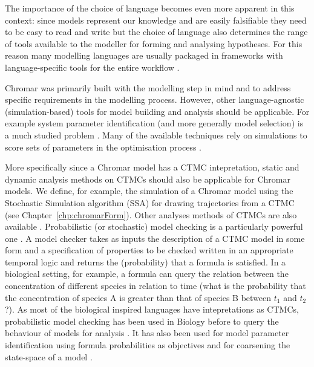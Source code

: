 The importance of the choice of language becomes even more apparent in this
context: since models represent our knowledge and are easily falsifiable they
need to be easy to read and write but the choice of language also determines the
range of tools available to the modeller for forming and analysing
hypotheses. For this reason many modelling languages are usually packaged in
frameworks with language-specific tools for the entire workflow
\citep{pradal_openalea:_2008, boutillier2018kappa,
  Calzone_Fages_Soliman_2006}.

Chromar was primarily built with the modelling step in mind and to address
specific requirements in the modelling process.  However, other
language-agnostic (\eg simulation-based) tools for model building and analysis
should be applicable. For example system parameter identification (and more
generally model selection) is a much studied problem \citep[inverse problem of
going from data to model;][]{engl2009inverse}. Many of the available techniques
rely on simulations to score sets of parameters in the optimisation process
\citep{moles2003parameter, toni2009simulation}.

More specifically since a Chromar model has a CTMC intepretation, static and
dynamic analysis methods on CTMCs should also be applicable for Chromar
models. We define, for example, the simulation of a Chromar model using the
Stochastic Simulation algorithm (SSA) for drawing trajectories from a CTMC (see
Chapter~\ref{chp:chromarForm}). Other analyses methods of CTMCs are also
available \citep[\eg approximation;][]{schnoerr2017approximation}. Probabilistic
(or stochastic) model checking is a particularly powerful one
\citep{Kwiatkowska_Norman_Parker_2007}. A model checker takes as inputs the
description of a CTMC model in some form and a specification of properties to be
checked written in an appropriate temporal logic
\cite{Haverkort_Hermanns_Katoen_Baier_2003, Aziz_Sanwal_Singhal_Brayton_2000}
and returns the (probability) that a formula is satisfied. In a biological
setting, for example, a formula can query the relation between the concentration
of different species in relation to time (\eg what is the probability that the
concentration of species A is greater than that of species B between $t_1$ and
$t_2$?). As most of the biological inspired languages have intepretations as
CTMCs, probabilistic model checking has been used in Biology before to query the
behaviour of models for analysis \citep{Brim2013,
  Heath_Kwiatkowska_Norman_Parker_Tymchyshyn_2008}. It has also been used for
model parameter identification using formula probabilities as objectives
\citep{Barnat_Brim_2012} and for coarsening the state-space of a model
\citep{michaelides2016property}.

